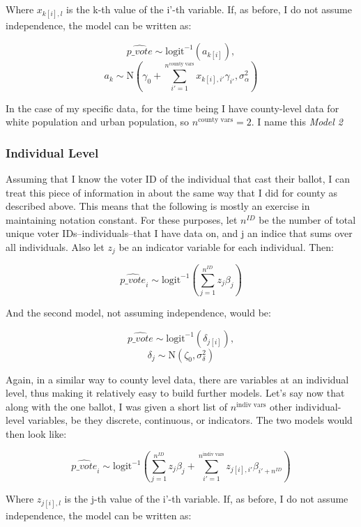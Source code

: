 \documentclass[12pt,twoside]{reedthesis}
\begin{document}
  Where \(x_{k[i], l}\) is the k-th value of the i'-th variable. If, as
  before, I do not assume independence, the model can be written as:
  
  \[\hat{p\_vote} \sim \text{logit}^{-1}(a_{k[i]}), \]
  \[a_{k} \sim \text{N}(\gamma_0 + \sum_{i'=1}^{n^{\text{county vars}}}x_{k[i], i'}\gamma_{i'}, \sigma_{\alpha}^2)\]
  
  In the case of my specific data, for the time being I have county-level
  data for white population and urban population, so
  \(n^{\text{county vars}} = 2\). I name this \emph{Model 2}
  
  \subsubsection{Individual Level}\label{individual-level}
  
  Assuming that I know the voter ID of the individual that cast their
  ballot, I can treat this piece of information in about the same way that
  I did for county as described above. This means that the following is
  mostly an exercise in maintaining notation constant. For these purposes,
  let \(n^{ID}\) be the number of total unique voter
  IDs--individuals--that I have data on, and j an indice that sums over
  all individuals. Also let \(z_{j}\) be an indicator variable for each
  individual. Then:
  
  \[\hat{p\_vote}_i \sim \text{logit}^{-1}(\sum_{j = 1}^{n^{ID}}z_{j}\beta_{j})\]
  
  And the second model, not assuming independence, would be:
  
  \[\hat{p\_vote} \sim \text{logit}^{-1}(\delta_{j[i]}), \]
  \[\delta_{j} \sim \text{N}(\zeta_0, \sigma_{\delta}^2)\]
  
  Again, in a similar way to county level data, there are variables at an
  individual level, thus making it relatively easy to build further
  models. Let's say now that along with the one ballot, I was given a
  short list of \(n^{\text{indiv vars}}\) other individual-level
  variables, be they discrete, continuous, or indicators. The two models
  would then look like:
  
  \[\hat{p\_vote}_i \sim \text{logit}^{-1}(\sum_{j = 1}^{n^{ID}}z_{j}\beta_{j} + \sum_{i'=1}^{n^{\text{indiv vars}}}z_{j[i], i'}\beta_{i'+n^{ID}})\]
  
  Where \(z_{j[i], l}\) is the j-th value of the i'-th variable. If, as
  before, I do not assume independence, the model can be written as:
  
\end{document}
